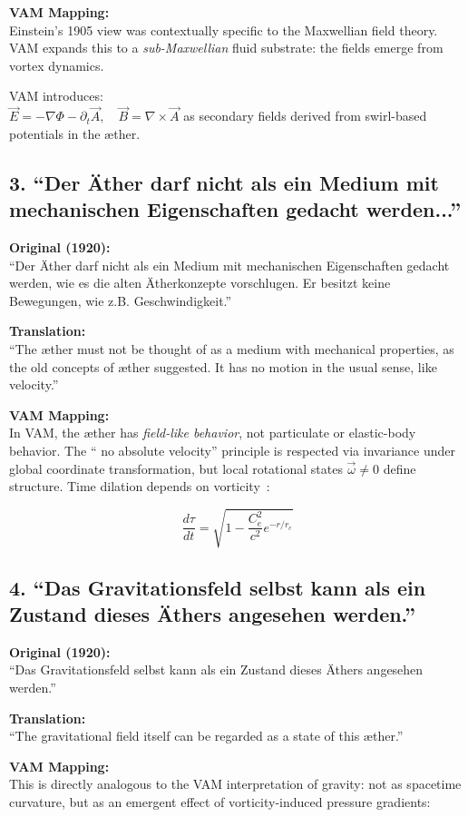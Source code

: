 \textbf{VAM Mapping:} \\
Einstein's 1905 view was contextually specific to the Maxwellian field theory. VAM expands this to a \emph{sub-Maxwellian} fluid substrate: the fields emerge from vortex dynamics.

VAM introduces: \\
\( \vec{E} = -\nabla \Phi - \partial_t \vec{A}, \quad \vec{B} = \nabla \times \vec{A} \) as secondary fields derived from swirl-based potentials in the æther.

\subsection*{3. ``Der Äther darf nicht als ein Medium mit mechanischen Eigenschaften gedacht werden...''}
\textbf{Original (1920):} \\
``Der Äther darf nicht als ein Medium mit mechanischen Eigenschaften gedacht werden, wie es die alten Ätherkonzepte vorschlugen. Er besitzt keine Bewegungen, wie z.B. Geschwindigkeit.''

\textbf{Translation:} \\
``The æther must not be thought of as a medium with mechanical properties, as the old concepts of æther suggested. It has no motion in the usual sense, like velocity.''

\textbf{VAM Mapping:} \\
In VAM, the æther has \emph{field-like behavior}, not particulate or elastic-body behavior. The `` no absolute velocity'' principle is respected via invariance under global coordinate transformation, but local rotational states \( \vec{\omega} \neq 0 \) define structure. Time dilation depends on vorticity~\cite{VAM-2}:

\[
\frac{d\tau}{dt} = \sqrt{1 - \frac{C_e^2}{c^2} e^{-r/r_c}}
\]

\subsection*{4. ``Das Gravitationsfeld selbst kann als ein Zustand dieses Äthers angesehen werden.''}
\textbf{Original (1920):} \\
``Das Gravitationsfeld selbst kann als ein Zustand dieses Äthers angesehen werden.''

\textbf{Translation:} \\
``The gravitational field itself can be regarded as a state of this æther.''

\textbf{VAM Mapping:} \\
This is directly analogous to the VAM interpretation of gravity: not as spacetime curvature, but as an emergent effect of vorticity-induced pressure gradients:

